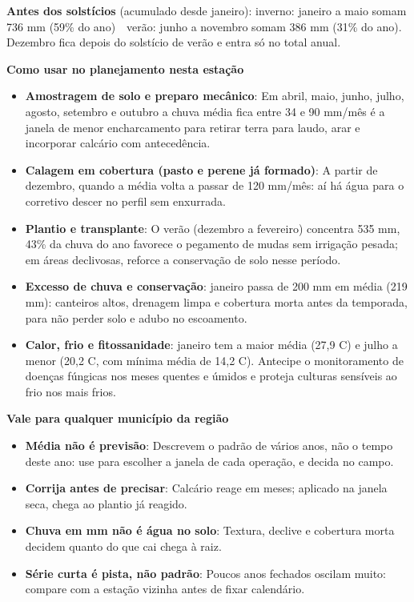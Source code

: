 \documentclass[10pt,a4paper]{article}
\begin{document}
\vspace{1pt}
{\footnotesize\textbf{Antes dos solstícios} (acumulado desde janeiro):
inverno: janeiro a maio somam 736 mm (59\% do ano) \,\textbullet\, verão: junho a novembro somam 386 mm (31\% do ano). Dezembro fica depois do solstício de verão e entra só no total
anual.}

\vspace{2pt}
{\bfseries\small Como usar no planejamento nesta estação}

\footnotesize\begin{itemize}\setlength{\itemsep}{0.5pt}
  \item \textbf{Amostragem de solo e preparo mecânico}: Em abril, maio, junho, julho, agosto, setembro e outubro a chuva média fica entre 34 e 90 mm/mês \textemdash{} é a janela de menor encharcamento para retirar terra para laudo, arar e incorporar calcário com antecedência.
  \item \textbf{Calagem em cobertura (pasto e perene já formado)}: A partir de dezembro, quando a média volta a passar de 120 mm/mês: aí há água para o corretivo descer no perfil sem enxurrada.
  \item \textbf{Plantio e transplante}: O verão (dezembro a fevereiro) concentra 535 mm, 43\% da chuva do ano \textemdash{} favorece o pegamento de mudas sem irrigação pesada; em áreas declivosas, reforce a conservação de solo nesse período.
  \item \textbf{Excesso de chuva e conservação}: janeiro passa de 200 mm em média (219 mm): canteiros altos, drenagem limpa e cobertura morta antes da temporada, para não perder solo e adubo no escoamento.
  \item \textbf{Calor, frio e fitossanidade}: janeiro tem a maior média (27,9 \textdegree{}C) e julho a menor (20,2 \textdegree{}C, com mínima média de 14,2 \textdegree{}C). Antecipe o monitoramento de doenças fúngicas nos meses quentes e úmidos e proteja culturas sensíveis ao frio nos mais frios.
\end{itemize}

\vspace{1pt}
{\bfseries\small Vale para qualquer município da região}

\scriptsize\begin{itemize}\setlength{\itemsep}{0.5pt}
  \item \textbf{Média não é previsão}: Descrevem o padrão de vários anos, não o tempo deste ano: use para escolher a janela de cada operação, e decida no campo.
  \item \textbf{Corrija antes de precisar}: Calcário reage em meses; aplicado na janela seca, chega ao plantio já reagido.
  \item \textbf{Chuva em mm não é água no solo}: Textura, declive e cobertura morta decidem quanto do que cai chega à raiz.
  \item \textbf{Série curta é pista, não padrão}: Poucos anos fechados oscilam muito: compare com a estação vizinha antes de fixar calendário.
\end{itemize}
\end{document}
